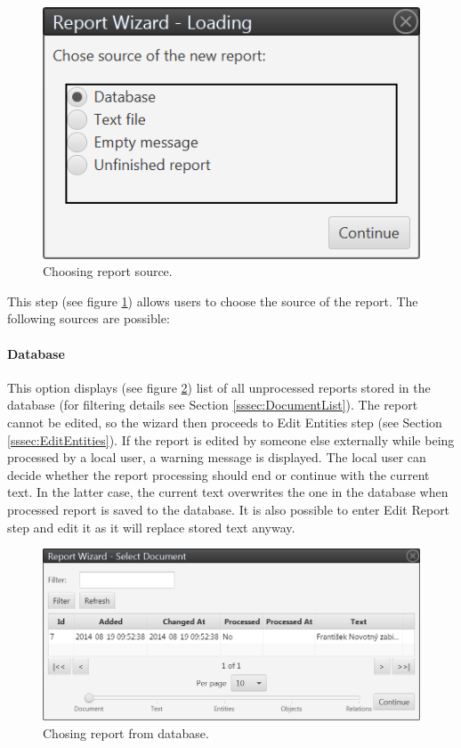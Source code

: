 \begin{figure}[!htb]
        \centering
        \includegraphics{Images/source}
        \caption{Choosing report source.}
        \label{fig:Source}
\end{figure}

This step (see figure \ref{fig:Source}) allows users to choose the source of the
report. The following sources are possible:

\paragraph{Database} This option displays (see figure \ref{fig:Database}) list
of all unprocessed reports stored in the database (for filtering details see
Section \ref{sssec:DocumentList}).
The report cannot be edited, so the wizard then proceeds to Edit Entities step
(see Section \ref{sssec:EditEntities}).  If the report is edited by someone else
externally while being processed by a local user, a warning message is
displayed. The local user can decide whether the report processing should end or
continue with the current text. In the latter case, the current text overwrites
the one in the database when processed report is saved to the database. It is
also possible to enter Edit Report step and edit it as it will replace stored
text anyway.

\begin{figure}[!htb]
        \centering
        \includegraphics[width=\textwidth]{Images/database}
        \caption{Chosing report from database.}
        \label{fig:Database}
\end{figure}

